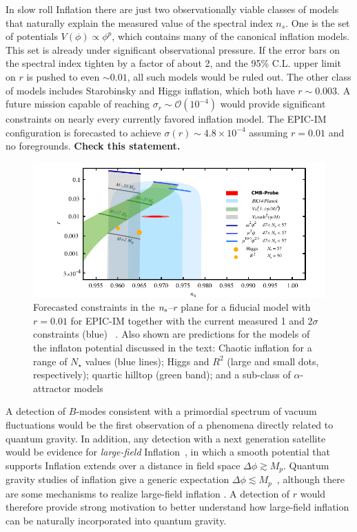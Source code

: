 In slow roll Inflation there are just two observationally viable classes of models that naturally explain the measured value of the spectral index $n_s$. One is the set of potentials $V(\phi)\propto\phi^p$, which contains many of the canonical inflation models. This 
set is already under significant observational pressure. If the error bars on the spectral index tighten by a factor of about 2, 
and the 95\% C.L. upper limit on $r$ is pushed to even $\sim0.01$, all such models would be ruled out. 
The other class of models includes Starobinsky and Higgs inflation, which both have $r\sim0.003$. A future mission 
capable of reaching $\sigma_r\sim\mathcal{O}(10^{-4})$ would provide significant constraints on nearly every currently favored 
inflation model. The EPIC-IM configuration is forecasted to achieve $\sigma(r)\sim4.8 \times 10^{-4}$ assuming $r=0.01$ 
and no foregrounds. {\bf Check this statement.}
\begin{figure}[ht!]
\hspace{-0.2in}
\parbox{4.in}{\centerline {
\includegraphics[width=4.5in]{figs/nsrlabeledrp01v1} } }
\hspace{-0.05in}
\parbox{2.5in}{
\caption{ \small \setlength{\baselineskip}{0.95\baselineskip}
Forecasted constraints in the $n_{\rm s}$--$r$ plane for a fiducial model with $r=0.01$ for EPIC-IM together 
with the current measured 1 and 2$\sigma$ constraints (blue) ~\cite{Array:2015xqh}. Also shown are predictions 
for the models of the inflaton potential discussed in the text: Chaotic inflation for a range of $N_\star$ values (blue lines); 
Higgs and $R^2$ (large and small dots, respectively);  quartic hilltop (green band); and a sub-class of $\alpha$-attractor
models~\cite{Kallosh:2013hoa}
\label{fig:nsrp01} } }
\vspace{-0.1in}
\end{figure}

A detection of $B$-modes consistent with a primordial spectrum of vacuum fluctuations would be the first observation 
of a phenomena directly related to quantum gravity. In addition, any detection with a next generation satellite would be 
evidence for {\it large-field} Inflation~\cite{Lyth:1996im}, in which a smooth potential that supports Inflation extends over 
a distance in field space $\Delta\phi \gtrsim M_p$. Quantum gravity studies of inflation give a generic expectation $\Delta\phi \lesssim M_p$~\cite{}, although 
there are some mechanisms to realize large-field inflation \cite{}. A detection of $r$ would therefore provide strong 
motivation to better understand how large-field inflation can be naturally incorporated into quantum gravity. 

